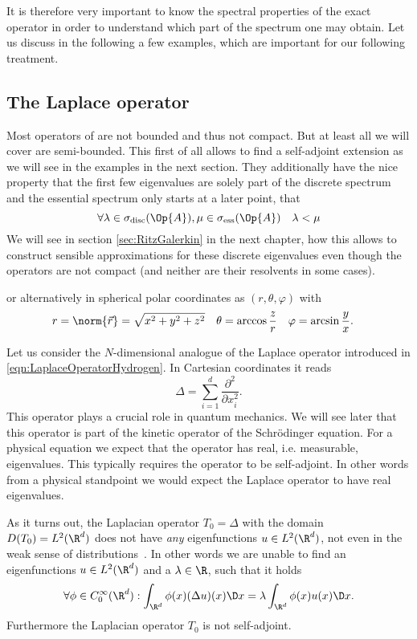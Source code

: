It is therefore very important to know
the spectral properties of the exact operator
in order to understand which part of the spectrum one may obtain.
Let us discuss in the following a few examples,
which are important for our following treatment.

\subsection{The Laplace operator}
\label{sec:SpectrumLaplace}




Most operators of \QM are not bounded and thus not compact.
But at least all we will cover are semi-bounded.
This first of all allows to find a self-adjoint extension as we will see in the examples
in the next section.
They additionally have the nice property that the first few eigenvalues are
solely part of the discrete spectrum and the essential spectrum only starts at a
later point, \ie that
\[ \forall \lambda \in \sigma_{\text{disc}}(\Op{A}),
    \mu \in \sigma_{\text{ess}}(\Op{A}) \quad \lambda < \mu \]
We will see in section \vref{sec:RitzGalerkin} in the next chapter,
how this allows to construct sensible approximations
for these discrete eigenvalues even though the operators are not compact
(and neither are their resolvents in some cases).



or alternatively in spherical polar coordinates
as $(r, \theta, \varphi)$ with
\begin{align*}
	r &= \norm{\vec{r}} = \sqrt{x^2+y^2+z^2} & \theta &= \arccos\frac{z}{r} & \varphi &= \arcsin\frac{y}{x}.
\end{align*}




Let us consider the $N$-dimensional analogue of the Laplace operator
introduced in \eqref{eqn:LaplaceOperatorHydrogen}.
In Cartesian coordinates it reads
\[ \Delta = \sum_{i=1}^d \frac{\partial^2}{\partial x_i^2}. \]
This operator plays a crucial role in quantum mechanics.
We will see later that this operator is part of the
kinetic operator of the Schrödinger equation.
For a physical equation we expect that the operator has
real, i.e. measurable, eigenvalues.
This typically requires the operator to be self-adjoint.
In other words from a physical standpoint we would expect
the Laplace operator to have real eigenvalues.

As it turns out,
the Laplacian operator $T_0 = \Delta$ with the domain $D(T_0) = L^2(\R^d)$
does not have \emph{any}
eigenfunctions $u \in L^2(\R^d)$,
not even in the weak sense of distributions~\cite{Helffer2013}.
In other words we are unable to find an eigenfunctions $u \in L^2(\R^d)$
and a $\lambda \in \R$,
such that it holds
\[ \forall \phi \in C^\infty_0(\R^d):  \int_{\R^d}\phi(x) (\Delta u)(x) \D x = \lambda \int_{\R^d} \phi(x) u(x) \D x. \]
Furthermore the Laplacian operator $T_0$ is not self-adjoint.

